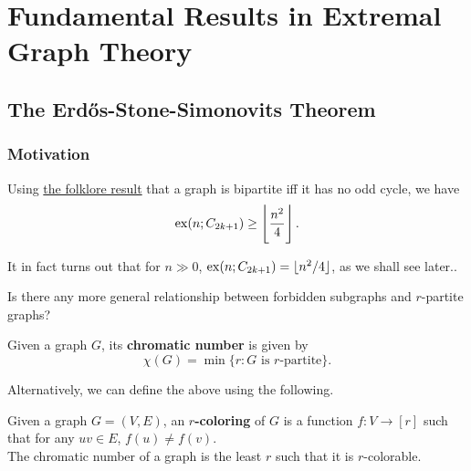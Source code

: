 \documentclass{article}
\begin{document}
\thispagestyle{empty}

\titleBC
\tableofcontents
\clearpage

\setcounter{section}{-1}




\section{Fundamental Results in Extremal Graph Theory}


	\subsection{The Erd\H{o}s-Stone-Simonovits Theorem}

		\subsubsection{Motivation}

			Using \href{https://proofwiki.org/wiki/Graph_is_Bipartite_iff_No_Odd_Cycles}{the folklore result} that a graph is bipartite iff it has no odd cycle, we have
			\[ \operatorname{ex}(n;C_{2k+1}) \ge \left\lfloor \frac{n^2}{4} \right\rfloor. \]
			\begin{remark}
				It in fact turns out that for $n\gg 0$, $\operatorname{ex}(n;C_{2k+1}) = \lfloor n^2/4 \rfloor$, as we shall see later..
			\end{remark}

			Is there any more general relationship between forbidden subgraphs and $r$-partite graphs?

			\begin{fdef}
				\label{def: chromatic number}
				Given a graph $G$, its \textbf{chromatic number} is given by
				\[ \chi(G) = \min\{r : G\text{ is $r$-partite}\}. \]
			\end{fdef}

			Alternatively, we can define the above using the following.

			\begin{fdef}
				\label{def: r-coloring}
				Given a graph $G=(V,E)$, an \textbf{$r$-coloring} of $G$ is a function $f : V \to [r]$ such that for any $uv\in E$, $f(u) \ne f(v)$.\\
				The chromatic number of a graph is the least $r$ such that it is $r$-colorable.
			\end{fdef}
\end{document}
